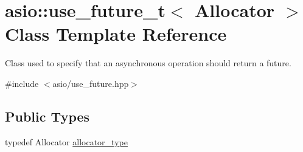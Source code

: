 \hypertarget{classasio_1_1use__future__t}{}\section{asio\+:\+:use\+\_\+future\+\_\+t$<$ Allocator $>$ Class Template Reference}
\label{classasio_1_1use__future__t}


Class used to specify that an asynchronous operation should return a future.  




{\ttfamily \#include $<$asio/use\+\_\+future.\+hpp$>$}

\subsection*{Public Types}
\begin{DoxyCompactItemize}
\item 
typedef Allocator \hyperlink{classasio_1_1use__future__t_a5f26423d6034eeba715c1249646c4700}{allocator\+\_\+type}
\end{DoxyCompactItemize}
